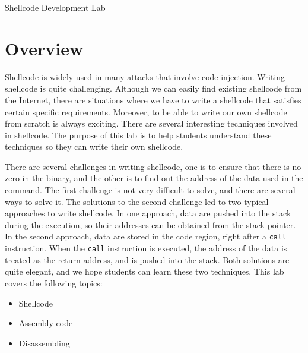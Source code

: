 









\begin{center}
{\LARGE Shellcode Development Lab}
\end{center}




\section{Overview}

Shellcode is widely used in many attacks that involve 
code injection. Writing shellcode is quite challenging. Although
we can easily find existing shellcode from the Internet, 
there are situations where we have to write a shellcode that 
satisfies certain specific requirements. Moreover, 
to be able to write our own shellcode from scratch is 
always exciting. 
There are several interesting 
techniques involved in shellcode. 
The purpose of 
this lab is to help students understand these techniques 
so they can write their own shellcode.  


There are several challenges in writing shellcode, one is to 
ensure that there is no zero in the binary, and the other is to find 
out the address of the data used in the command. 
The first challenge is not very difficult to solve, and there
are several ways to solve it. The solutions to the 
second challenge led to two typical approaches to 
write shellcode. In one approach, data are pushed 
into the stack during the execution, so their addresses 
can be obtained from the stack pointer. 
In the second approach, data are stored in the code 
region, right after a \texttt{call} instruction. 
When the \texttt{call} instruction is executed, 
the address of the data is treated as the return address,
and is pushed into the stack. 
Both solutions are quite elegant, 
and we hope students can learn these two techniques. 
This lab covers the following topics:

\begin{itemize}[noitemsep]
\item Shellcode
\item Assembly code
\item Disassembling 
\end{itemize}


